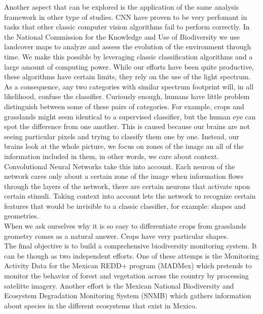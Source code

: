 Another aspect that can be explored is the application of the same analysis framework in other type of studies. CNN have proven to be very perfomant in tasks that other classic computer vision algorithms fail to perform correctly. In the National Commission for the Knowledge and Use of Biodiversity we use landcover maps to analyze and assess the evolution of the environment through time. We make this possible by leveraging classic classification algorithms and a large amount of computing power. While our efforts have been quite productive, these algorithms have certain limits, they rely on the use of the light spectrum. As a consequence, any two categories with similar spectrum footprint will, in all likelihood, confuse the classifier. Curiously enough, humans have little problem distinguish between some of these pairs of categories. For example, crops and grasslands might seem identical to a supervised classifier, but the human eye can spot the difference from one another. This is caused because our brains are not seeing particular pixels and trying to classify them one by one. Instead, our brains look at the whole picture, we focus on zones of the image an all of the information included in them, in other words, we care about context. Convolutional Neural Networks take this into account. Each neuron of the network cares only about a certain zone of the image when information flows through the layers of the network, there are certain neurons that activate upon certain stimuli. Taking context into account lets the network to recognize certain features that would be invisible to a classic classifier, for example: shapes and geometries.\\

When we ask ourselves why it is so easy to differentiate crops from grasslands geometry comes as a natural answer. Crops have very particular shapes.\\

The final objective is to build a comprehensive biodiversity monitoring system. It can be though as two independent efforts. One of these attemps is the Monitoring Activity Data for the Mexican REDD+ program (MADMex) \cite{rs6053923} which pretends to monitor the behavior of forest and vegetation across the country by processing satelitte imagery. Another effort is the Mexican National Biodiversity and Ecosystem Degradation Monitoring System (SNMB) \cite{GARCIAALANIZ201762} which gathers information about species in the different ecosystems that exist in Mexico.\\

